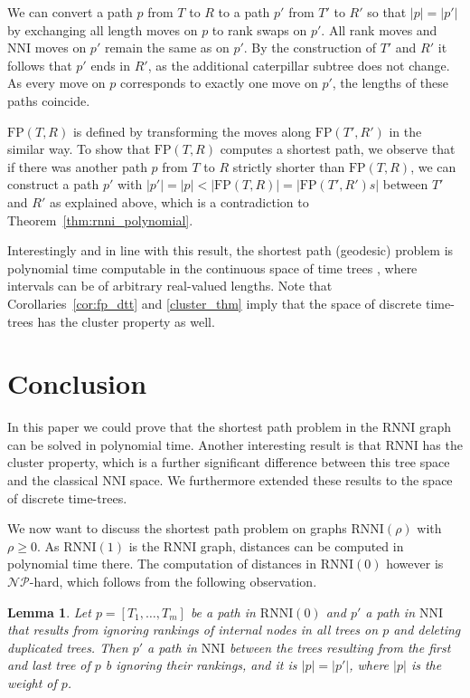 \documentclass[11pt]{amsart}
\newtheorem{lemma}{Lemma}
\newcommand{\rnni}{\mathrm{RNNI}}
\newcommand{\nni}{\mathrm{NNI}}
\newcommand{\fp}{\mathrm{FP}}
\newcommand{\np}{\mathcal{NP}}
\newcommand{\p}{\mathcal{P}}
\newcommand{\summary}[1]{} %
\begin{document}
	We can convert a path $p$ from $T$ to $R$ to a path $p'$ from $T'$ to $R'$ so that $|p| = |p'|$ by exchanging all length moves on $p$ to rank swaps on $p'$.
	All rank moves and $\nni$ moves on $p'$ remain the same as on $p'$.
	By the construction of $T'$ and $R'$ it follows that $p'$ ends in $R'$, as the additional caterpillar subtree does not change.
	As every move on $p$ corresponds to exactly one move on $p'$, the lengths of these paths coincide.

	$\fp(T,R)$ is defined by transforming the moves along $\fp(T',R')$ in the similar way.
	To show that $\fp(T, R)$ computes a shortest path, we observe that if there was another path $p$ from $T$ to $R$ strictly shorter than $\fp(T, R)$, we can construct a path $p'$ with $|p'| = |p| < |\fp(T,R)| = |\fp(T',R')s|$ between $T'$ and $R'$ as explained above, which is a contradiction to Theorem~\ref{thm:rnni_polynomial}.
\endproof

Interestingly and in line with this result, the shortest path (geodesic) problem is polynomial time computable in the continuous space of time trees \autocite{Gavryushkin2016-uu}, where intervals can be of arbitrary real-valued lengths.
Note that Corollaries~\ref{cor:fp_dtt} and \ref{cluster_thm} imply that the space of discrete time-trees has the cluster property as well.

\section{Conclusion}

\summary{What we achieved in this paper}
In this paper we could prove that the shortest path problem in the $\rnni$ graph can be solved in polynomial time.
Another interesting result is that $\rnni$ has the cluster property, which is a further significant difference between this tree space and the classical $\nni$ space.
We furthermore extended these results to the space of discrete time-trees.

\summary{Summarising results on complexity of $\rnni(\rho)$ -- $\rnni(1) \in \p$ and $\rnni(0) \in \np$}
We now want to discuss the shortest path problem on graphs $\rnni(\rho)$ with $\rho \geq 0$.
As $\rnni(1)$ is the $\rnni$ graph, distances can be computed in polynomial time there.
The computation of distances in $\rnni(0)$ however is $\np$-hard, which follows from the following observation.

\begin{lemma}
Let $p = [T_1, \ldots, T_m]$ be a path in $\rnni(0)$ and $p'$ a path in $\nni$ that results from ignoring rankings of internal nodes in all trees on $p$ and deleting duplicated trees.
Then $p'$ a path in $\nni$ between the trees resulting from the first and last tree of $p$ b ignoring their rankings, and it is $|p| = |p'|$, where $|p|$ is the weight of $p$.
\end{lemma}
\end{document}
